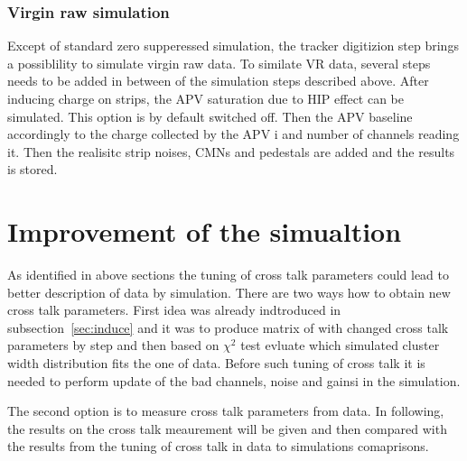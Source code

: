  
\subsubsection{Virgin raw simulation}

Except of standard zero supperessed simulation, the tracker digitizion step brings a possiblility to simulate virgin raw data. To similate VR data, several steps needs to be added in between of the simulation steps described above. After inducing charge on strips, the APV saturation due to HIP effect can be simulated. This option is by default switched off. Then the APV baseline accordingly to the charge collected by the APV i and number of channels reading it. Then the realisitc strip noises, CMNs and pedestals are added and the results is stored.


\newpage

\section{Improvement of the simualtion}

As identified in above sections the tuning of cross talk parameters could lead to better description of data by simulation. There are two ways how to obtain new cross talk parameters. First idea was already indtroduced in subsection~\ref{sec:induce} and it was to produce matrix of with changed cross talk parameters by step and then based on $\chi^{2}$ test evluate which simulated cluster width distribution fits the one of data. Before such tuning of cross talk it is needed to perform update of the bad channels, noise and gainsi in the simulation.

The second option is to measure cross talk parameters from data. In following, the results on the cross talk meaurement will be given and then compared with the results from the tuning of cross talk in data to simulations comaprisons.



